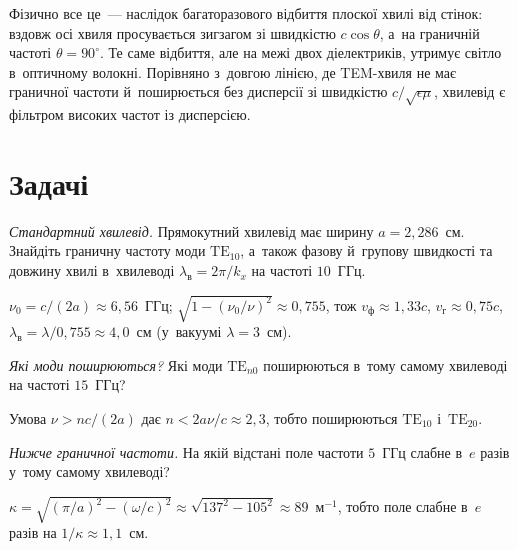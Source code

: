 Фізично все це~--- наслідок багаторазового відбиття плоскої хвилі від стінок: вздовж осі хвиля просувається зигзагом зі швидкістю $c\cos\theta$, а~на граничній частоті $\theta=90^\circ$. Те саме відбиття, але на межі двох діелектриків, утримує світло в~оптичному волокні. Порівняно з~довгою лінією, де TEM-хвиля не має граничної частоти й~поширюється без дисперсії зі швидкістю $c/\sqrt{\epsilon\mu}$, хвилевід є фільтром високих частот із дисперсією.


\section*{Задачі}
{}


\begin{problem}\label{prb:WR90}
	\emph{Стандартний хвилевід.} Прямокутний хвилевід має ширину $a = 2{,}286$~см. Знайдіть граничну частоту моди
	$\text{TE}_{10}$, а~також фазову й~групову швидкості та довжину хвилі в~хвилеводі $\lambda_\text{в}=2\pi/k_x$ на частоті $10$~ГГц.
	\begin{solution}
		$\nu_0 = c/(2a) \approx 6{,}56$~ГГц; $\sqrt{1-(\nu_0/\nu)^2} \approx 0{,}755$, тож $v_\text{ф} \approx 1{,}33c$, $v_\text{г} \approx 0{,}75c$, $\lambda_\text{в} = \lambda/0{,}755 \approx 4{,}0$~см (у~вакуумі $\lambda = 3$~см).
	\end{solution}
\end{problem}

\begin{problem}\label{prb:WaveguideModes}
	\emph{Які моди поширюються?} Які моди $\text{TE}_{n0}$ поширюються в~тому самому хвилеводі на частоті $15$~ГГц?
	\begin{solution}
		Умова $\nu > n c/(2a)$ дає $n < 2a\nu/c \approx 2{,}3$, тобто поширюються $\text{TE}_{10}$ і~$\text{TE}_{20}$.
	\end{solution}
\end{problem}

\begin{problem}\label{prb:BelowCutoff}
	\emph{Нижче граничної частоти.} На якій відстані поле частоти $5$~ГГц слабне в~$e$ разів у~тому самому хвилеводі?
	\begin{solution}
		$\kappa = \sqrt{(\pi/a)^2 - (\omega/c)^2} \approx \sqrt{137^2 - 105^2} \approx 89$~м$^{-1}$, тобто поле слабне в~$e$ разів на $1/\kappa \approx 1{,}1$~см.
	\end{solution}
\end{problem}

